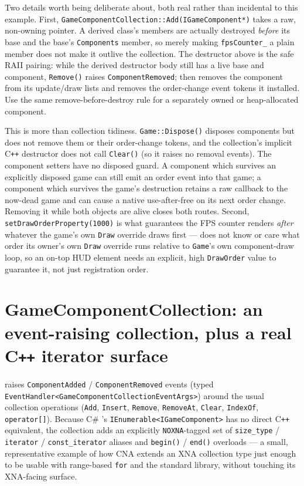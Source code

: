 Two details worth being deliberate about, both real rather than incidental to this example.
First, \texttt{GameComponentCollection::Add(IGameComponent*)} takes a raw, non-owning
pointer. A derived class's members are actually destroyed \emph{before} its  base
and the base's \texttt{Components} member, so merely making \texttt{fpsCounter\_} a plain member
does not make it outlive the collection. The destructor above is the safe RAII pairing: while the
derived destructor body still has a live base and component, \texttt{Remove()} raises
\texttt{ComponentRemoved};  then removes the component from its update/draw lists
and removes the order-change event tokens it installed. Use the same remove-before-destroy rule
for a separately owned or heap-allocated component.

This is more than collection tidiness. \texttt{Game::Dispose()} disposes components but does not
remove them or their order-change tokens, and the collection's implicit C\texttt{++} destructor
does not call \texttt{Clear()} (so it raises no removal events). The component setters have no
disposed guard. A component which survives an explicitly disposed game can still emit an order
event into that game; a component which survives the game's destruction retains a raw callback to
the now-dead game and can cause a native use-after-free on its next order change. Removing it
while both objects are alive closes both routes. Second,
\texttt{setDrawOrderProperty(1000)} is what guarantees the FPS counter renders \emph{after}
whatever the game's own \texttt{Draw} override draws first --- 
does not know or care what order its owner's own \texttt{Draw} override runs relative to
\texttt{Game}'s own component-draw loop, so an on-top HUD element needs an explicit, high
\texttt{DrawOrder} value to guarantee it, not just registration order.

\section[GameComponentCollection: an event-raising collection]{GameComponentCollection: an event-raising collection, plus a real C\texttt{++} iterator surface}

 raises \texttt{ComponentAdded} / \texttt{ComponentRemoved}
events (typed \texttt{EventHandler<GameComponentCollectionEventArgs>}) around the usual
collection operations (\texttt{Add}, \texttt{Insert}, \texttt{Remove}, \texttt{RemoveAt},
\texttt{Clear}, \texttt{IndexOf}, \texttt{operator[]}). Because C\# 's
\texttt{IEnumerable<IGameComponent>} has no direct C\texttt{++} equivalent, the collection
adds an explicitly \texttt{NOXNA}-tagged set of \texttt{size\_type} / \texttt{iterator} /
\texttt{const\_iterator} aliases and \texttt{begin()} / \texttt{end()} overloads --- a small,
representative example of how CNA extends an XNA collection type just enough to be usable
with range-based \texttt{for} and the standard library, without touching its XNA-facing
surface.


